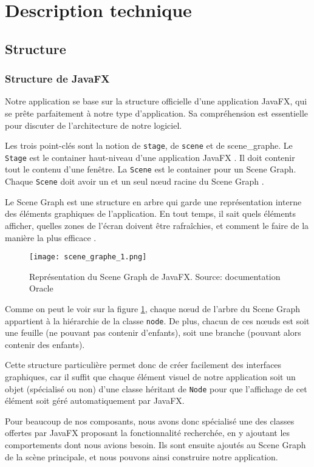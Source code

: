 \section{Description technique}

\subsection{Structure}
\subsubsection{Structure de JavaFX}
Notre application se base sur la structure officielle d'une application JavaFX, qui se prête parfaitement à notre type d'application. Sa compréhension est essentielle pour discuter de l'architecture de notre logiciel.
\par
Les trois point-clés sont la notion de \texttt{\gls{stage}}, de \texttt{\gls{scene}} et de \gls{scene_graphe}. Le \texttt{Stage} est le container haut-niveau d'une application JavaFX \cite{javadoc_stage}. Il doit contenir tout le contenu d'une fenêtre. La \texttt{Scene} est le container pour un Scene Graph. Chaque \texttt{Scene} doit avoir un et un seul n\oe ud racine du Scene Graph \cite{javadoc_scene}.
\par
Le Scene Graph est une structure en arbre qui garde une représentation interne des éléments graphiques de l'application. En tout temps, il sait quels éléments afficher, quelles zones de l'écran doivent être rafraîchies, et comment le faire de la manière la plus efficace \cite{javadoc_scene_graphe}. 	

\begin{figure}[!ht]
	\caption{Représentation du Scene Graph de JavaFX. Source: documentation Oracle \cite{javadoc_scene_graphe}}
	\centering
	\texttt{[image: scene\_graphe\_1.png]}
	\label{fig:scene_graphe_1}
\end{figure}
Comme on peut le voir sur la figure \ref{fig:scene_graphe_1}, chaque n\oe ud de l'arbre du Scene Graph appartient à la hiérarchie de la classe \texttt{\gls{node}}. De plus, chacun de ces n\oe uds est soit une feuille (ne pouvant pas contenir d'enfants), soit une branche (pouvant alors contenir des enfants).
\par
Cette structure particulière permet donc de créer facilement des interfaces graphiques, car il suffit que chaque élément visuel de notre application soit un objet (spécialisé ou non) d'une classe héritant de \texttt{Node} pour que l'affichage de cet élément soit géré automatiquement par JavaFX.
\par
Pour beaucoup de nos composants, nous avons donc spécialisé une des classes offertes par JavaFX proposant la fonctionnalité recherchée, en y ajoutant les comportements dont nous avions besoin. Ils sont ensuite ajoutés au Scene Graph de la scène principale, et nous pouvons ainsi construire notre application.

